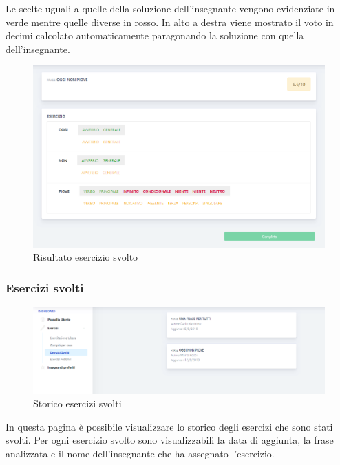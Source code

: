 	Le scelte uguali a quelle della soluzione dell'insegnante vengono evidenziate in verde mentre quelle diverse in rosso. In alto a destra viene mostrato il voto in decimi calcolato automaticamente paragonando la soluzione con quella dell'insegnante.
	
	\begin{figure}[H]
            	\centering
            	\includegraphics[width=17cm]{sez/img/studente/risultatoEsercizio.png} 
            	\caption{Risultato esercizio svolto}\label{fig:1}
        	\end{figure}     
        
        
        \subsubsection{Esercizi svolti}
        	\begin{figure}[H]
            	\centering
            	\includegraphics[width=17cm]{sez/img/studente/esercizisvolti.PNG} 
            	\caption{Storico esercizi svolti}\label{fig:1}
        	\end{figure}
          In questa pagina è possibile visualizzare lo storico degli esercizi che sono stati svolti. Per ogni esercizio svolto sono visualizzabili la data di aggiunta, la frase analizzata e il nome dell'insegnante che ha assegnato l'esercizio.
          
